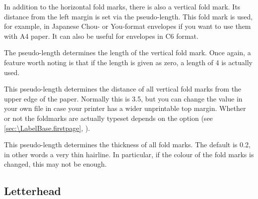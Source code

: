 \begin{Declaration}
\end{Declaration}
In addition to the horizontal fold marks,
there is also a vertical fold mark. Its distance from the left margin is set
via the  pseudo-length. This fold mark is used, for
example, in Japanese Chou- or You-format envelopes if you want to use them
with A4 paper. It can also be useful for envelopes in C6 format.%
\EndIndexGroup


\begin{Declaration}
\end{Declaration}
The 
pseudo-length determines the length of the vertical fold mark. Once again, a
feature worth noting is that if the length is given as zero, a length of
4 is actually used.%
\EndIndexGroup


\begin{Declaration}
\end{Declaration}
This pseudo-length determines the distance of
all vertical fold marks from the upper edge of the paper. Normally this is
3.5, but you can change the value in your own
 file in case your printer has a wider unprintable
top margin. Whether or not the foldmarks are actually typeset depends on the
%
%
 option (see
\autoref{sec:\LabelBase.firstpage}, ).
%
\EndIndexGroup


\begin{Declaration}
\end{Declaration}
This pseudo-length determines the
thickness of all fold marks. The default is 0.2, in other words a
very thin hairline. In particular, if the colour of the fold
marks is changed, this may not be enough.%
\EndIndexGroup
%
\EndIndexGroup


\subsection{Letterhead}
\BeginIndexGroup
{}%

